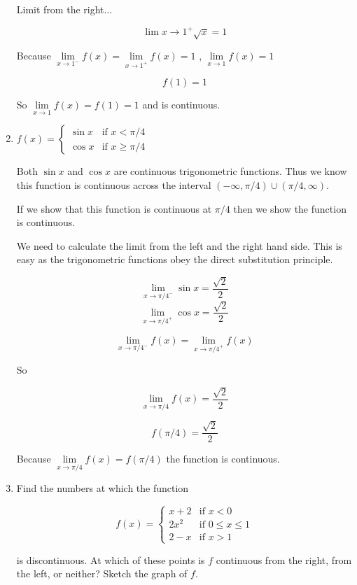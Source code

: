 \documentclass{article}
\begin{document}
\begin{enumerate}
				Limit from the right...

				$$\lim \limits {x \to 1^{+}} \sqrt{x} = 1$$

				Because $\lim \limits _{x \to 1^{-}} f(x) = \lim \limits _{x \to 1^{+}} f(x) = 1$
				, $\lim \limits _{x \to 1} f(x) = 1$

				$$f(1) = 1$$

				So $\lim \limits _{x \to 1} f(x) = f(1) = 1$ and is continuous.

			\item $f(x) =
				\begin{cases}
					\sin x & \text{if } x < \pi/4 \\
					\cos x & \text{if } x \geq \pi/4
				\end{cases}$

				
				Both $\sin x$ and $\cos x$ are continuous trigonometric functions.
				Thus we know this function is continuous across the interval
				$(-\infty, \pi/4) \cup (\pi/4, \infty)$.

				If we show that this function is continuous at $\pi/4$ then we show
				the function is continuous.

				We need to calculate the limit from the left and the right hand side.
				This is easy as the trigonometric functions obey the direct substitution
				principle.

				$$\lim \limits _{x \to \pi/4^{-}} \sin x = \frac{\sqrt{2}}{2}$$
				$$\lim \limits _{x \to \pi/4^{+}} \cos x = \frac{\sqrt{2}}{2}$$


				$$\lim \limits _{x\to \pi/4^{-}} f(x) = \lim \limits _{x \to \pi/4^{+}} f(x)$$

				So

				$$\lim \limits _{x \to \pi/4} f(x) = \frac{\sqrt{2}}{2}$$

				$$f(\pi/4) = \frac{\sqrt{2}}{2}$$

				Because $\lim \limits _{x \to \pi/4} f(x) = f(\pi/4)$ the function is continuous.

			\item Find the numbers at which the function 

				$$f(x) =
					\begin{cases}
						x + 2 & \text{if } x < 0 \\
						2x^2 & \text{if } 0 \leq x \leq 1 \\
						2 - x & \text{if } x > 1
					\end{cases}$$

			is discontinuous. At which of these points is $f$ continuous from the right, from the left,
			or neither? Sketch the graph of $f$.


\end{enumerate}
\end{document}

